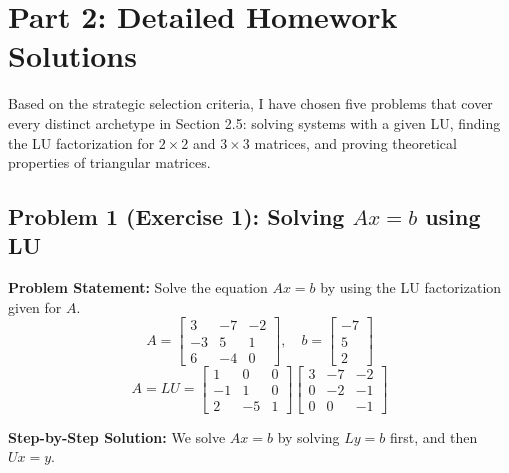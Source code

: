 \documentclass[11pt]{article}
\begin{document}
\newpage
\section{Part 2: Detailed Homework Solutions}

Based on the strategic selection criteria, I have chosen five problems that cover every distinct archetype in Section 2.5: solving systems with a given LU, finding the LU factorization for $2 \times 2$ and $3 \times 3$ matrices, and proving theoretical properties of triangular matrices.

\subsection{Problem 1 (Exercise 1): Solving $Ax=b$ using LU}
\textbf{Problem Statement:} Solve the equation $Ax = b$ by using the LU factorization given for $A$.
\[ A = \begin{bmatrix} 3 & -7 & -2 \\ -3 & 5 & 1 \\ 6 & -4 & 0 \end{bmatrix}, \quad b = \begin{bmatrix} -7 \\ 5 \\ 2 \end{bmatrix} \]
\[ A = LU = \begin{bmatrix} 1 & 0 & 0 \\ -1 & 1 & 0 \\ 2 & -5 & 1 \end{bmatrix} \begin{bmatrix} 3 & -7 & -2 \\ 0 & -2 & -1 \\ 0 & 0 & -1 \end{bmatrix} \]

\textbf{Step-by-Step Solution:}
We solve $Ax = b$ by solving $Ly = b$ first, and then $Ux = y$.
\end{document}
